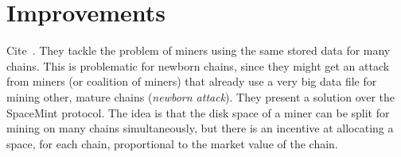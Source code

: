 \section{Improvements}

Cite~\cite{TangZDWLG0L19}. They tackle the problem of miners using the same stored data
for many chains. This is problematic for newborn chains, since they might get an attack
from miners (or coalition of miners) that already use a very big data file for mining other,
mature chains (\emph{newborn attack}). They present a solution over the SpaceMint protocol.
The idea is that the disk space of a miner can be split for mining on many chains
simultaneously, but there is an incentive at allocating a space, for each chain, proportional
to the market value of the chain.

